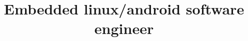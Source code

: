 \title{\large{Embedded linux/android software engineer}}
\address{668 Willowgate St, Mountain View, 94043, CA}
